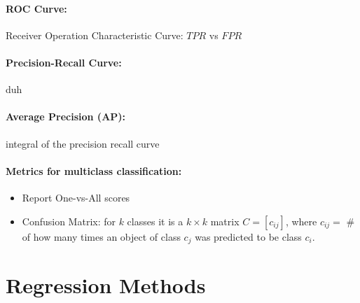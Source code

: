 \documentclass{article}
\renewcommand{\|}{\,\,|\,\,}
\begin{document}
\paragraph{ROC Curve:} Receiver Operation Characteristic Curve: $TPR$ vs $FPR$
\paragraph{Precision-Recall Curve:} duh
\paragraph{Average Precision (AP):} integral of the precision recall curve
\paragraph{Metrics for multiclass classification:}
\begin{itemize}
\item Report One-vs-All scores
\item Confusion Matrix: for $k$ classes it is a $k \times k$ matrix $C =
  [c_{ij}]$, where $c_{ij} = $ \# of how many times an object of class $c_j$ was
  predicted to be class $c_i$. 
\end{itemize}
\section{Regression Methods}
\end{document}
